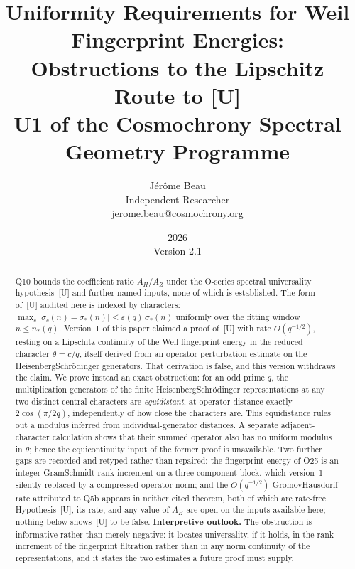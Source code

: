\documentclass[12pt,a4paper]{article}
\theoremstyle{definition}
\theoremstyle{remark}
\begin{document}
    \title{%
      Uniformity Requirements for Weil Fingerprint Energies:\\
      Obstructions to the Lipschitz Route to \textup{[U]}\\[0.4em]
      {\large U1 of the Cosmochrony Spectral Geometry Programme}%
    }
    \author{J\'er\^ome Beau\\
    \small Independent Researcher\\
    \small \href{mailto:jerome.beau@cosmochrony.org}{jerome.beau@cosmochrony.org}
    }
    \date{2026\\[2pt]\small Version 2.1}
  \maketitle

  \begin{abstract}
    Q10 bounds the coefficient ratio $A_H/A_Z$ under the O-series spectral universality
    hypothesis~[U] and further named inputs, none of which is established.
    The form of~[U] audited here is indexed by characters:
    $\max_c |\sigma_c(n) - \sigma_*(n)| \leq \varepsilon(q)\,\sigma_*(n)$
    uniformly over the fitting window $n \leq n_*(q)$.
    Version~1 of this paper claimed a proof of~[U] with rate $O(q^{-1/2})$, resting on a
    Lipschitz continuity of the Weil fingerprint energy in the reduced character
    $\theta = c/q$, itself derived from an operator perturbation estimate on the
    Heisenberg\textendash Schr\"odinger generators.
    That derivation is false, and this version withdraws the claim.
    We prove instead an exact obstruction: for an odd prime $q$, the multiplication
    generators of the finite Heisenberg\textendash Schr\"odinger representations at any two
    distinct central characters are
    \emph{equidistant}, at operator distance exactly $2\cos(\pi/2q)$, independently of how
    close the characters are.
    This equidistance rules out a modulus inferred from individual-generator distances.
    A separate adjacent-character calculation shows that their summed operator also has
    no uniform modulus in $\theta$; hence the equicontinuity input of the former proof is
    unavailable.
    Two further gaps are recorded and retyped rather than repaired: the fingerprint energy
    of O25 is an integer Gram\textendash Schmidt rank increment on a three-component block,
    which version~1 silently replaced by a compressed operator norm; and the
    $O(q^{-1/2})$ Gromov\textendash Hausdorff rate attributed to Q5b appears in neither
    cited theorem, both of which are rate-free.
    Hypothesis~[U], its rate, and any value of $A_H$ are open on the inputs
    available here; nothing below shows~[U] to be false.
    \textbf{Interpretive outlook.}
    The obstruction is informative rather than merely negative: it locates universality, if
    it holds, in the rank increment of the fingerprint filtration rather than in any norm
    continuity of the representations, and it states the two estimates a future proof must
    supply.
  \end{abstract}
\end{document}
